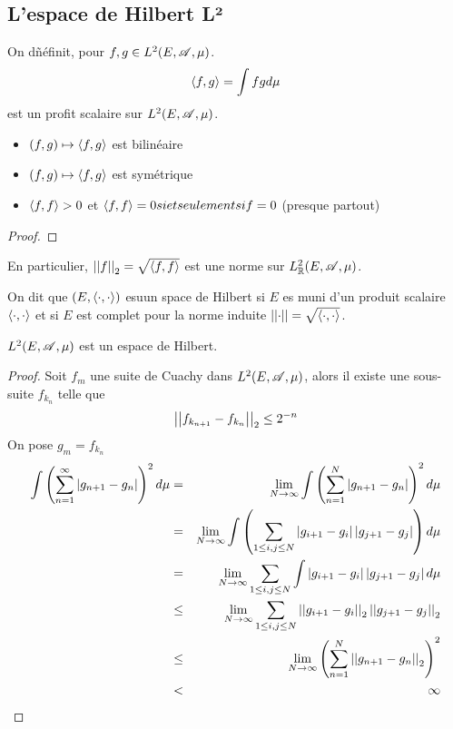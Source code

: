 \subsection{L'espace de Hilbert L²}

\begin{definition}
	On dñéfinit, pour $f,g \in L^2(E,\mathscr{A}, \mu)$.
	$$\left\langle f, g \right\rangle = \int fg d \mu$$
	est un profit scalaire sur $L^2(E, \mathscr{A}, \mu)$.
	\begin{itemize}
		\item $(f,g) \mapsto \left\langle f, g \right\rangle$ est bilinéaire
		\item $(f,g) \mapsto \left\langle f, g \right\rangle$ est symétrique
		\item $\left\langle f, f \right\rangle > 0$ et $\left\langle f, f \right\rangle = 0 si et seulement si f = 0$ (presque partout)
	\end{itemize}
\end{definition}


\begin{proof}
\end{proof}


\begin{remarque}
	En particulier, $\left|\left|f\right|\right|_2 = \sqrt{\left\langle f, f \right\rangle}$ est une norme sur $L^2_{\mathbb{R}}(E, \mathscr{A}, \mu)$.
\end{remarque}

\begin{definition}
	On dit que $(E, \left\langle \cdot, \cdot \right\rangle)$  esuun space de Hilbert si $E$ es muni d'un produit scalaire $\left\langle \cdot, \cdot \right\rangle$ et
	si $E$ est complet pour la norme induite $\left|\left|\cdot\right|\right| = \sqrt{\left\langle \cdot, \cdot \right\rangle}$.
\end{definition}

\begin{theorem}[Riesz]
	$L^2(E, \mathscr{A}, \mu)$ est un espace de Hilbert.
\end{theorem}

\begin{proof}
	Soit $f_m$ une suite de Cuachy dans $L^2(E, \mathscr{A}, \mu)$, alors il existe une sous-suite $f_{k_n}$ telle que
	$$\left|\left|f_{k_{n+1}} - f_{k_n}\right|\right|_2 \leq 2^{-n}$$
	On pose $g_m = f_{k_n}$
	\begin{eqnarray*}
		\int \left( \sum\limits_{n=1}^\infty \left|g_{n+1} - g_n\right| \right)^2 d \mu &=& \lim_{N \to \infty} \int \left( \sum\limits_{n=1}^N \left|g_{n+1} - g_n\right| \right)^2 d \mu \\
		&=& \lim_{N \to \infty} \int \left( \sum\limits_{1 \leq i, j \leq N} \left|g_{i+1} - g_i\right| \left|g_{j+1} - g_j\right| \right) d \mu \\
		&=& \lim_{N \to \infty}   \sum\limits_{1 \leq i, j \leq N} \int\left|g_{i+1} - g_i\right| \left|g_{j+1} - g_j\right|  d \mu \\
		&\leq& \lim_{N \to \infty} \sum\limits_{1 \leq i, j \leq N} \left|\left|g_{i+1} - g_i\right|\right|_2 \left|\left|g_{j+1} - g_j\right|\right|_2 \\
		&\leq& \lim_{N \to \infty} \left( \sum\limits_{n=1}^N \left|\left|g_{n+1} - g_n\right|\right|_2 \right)^2 \\
		&<& \infty
	\end{eqnarray*}
\end{proof}

